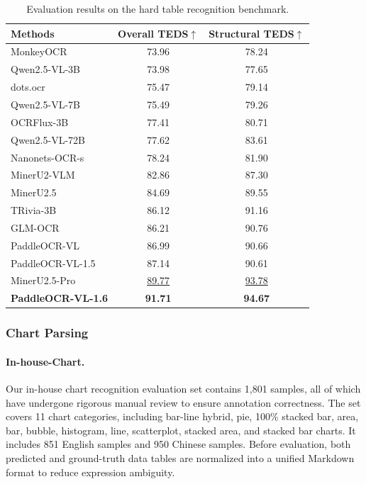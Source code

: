 \documentclass[11pt, a4paper,logo,  copyright, nonumbering]{paddleocr}
\begin{document}
\begin{table}[H]
    \centering
    \scriptsize
    \setlength{\tabcolsep}{4pt}
    \renewcommand{\arraystretch}{0.85}
    \begin{tabular}{l|c c}
        \toprule
        \textbf{Methods} & \textbf{Overall TEDS$\uparrow$} & \textbf{Structural TEDS$\uparrow$} \\
        \midrule
        MonkeyOCR~\cite{li2025monkeyocr} & 73.96 & 78.24 \\
        Qwen2.5-VL-3B~\cite{bai2025qwen2} & 73.98 & 77.65 \\
        dots.ocr~\cite{dotsocr} & 75.47 & 79.14 \\
        Qwen2.5-VL-7B~\cite{bai2025qwen2} & 75.49 & 79.26 \\
        OCRFlux-3B~\cite{OCRFlux} & 77.41 & 80.71 \\
        Qwen2.5-VL-72B~\cite{bai2025qwen2} & 77.62 & 83.61 \\
        Nanonets-OCR-s~\cite{Nanonets-OCR-S} & 78.24 & 81.90 \\
        MinerU2-VLM~\cite{MinerU2} & 82.86 & 87.30 \\
        MinerU2.5~\cite{niu2025mineru2} & 84.69 & 89.55 \\
        TRivia-3B~\cite{TRivia} & 86.12 & 91.16 \\
        GLM-OCR~\cite{duan2026glmocrtechnicalreport} & 86.21 & 90.76 \\
        PaddleOCR-VL~\cite{cui2025paddleocrvl} & 86.99 & 90.66 \\
        PaddleOCR-VL-1.5\cite{cui2026paddleocrvl15multitask09bvlm} & 87.14 & 90.61 \\
        MinerU2.5-Pro\cite{MinerU25Pro} & \cellcolor{cyan!15}\underline{89.77} & \cellcolor{cyan!15}\underline{93.78} \\
        \textbf{PaddleOCR-VL-1.6} & \cellcolor{red!15}\textbf{91.71} & \cellcolor{red!15}\textbf{94.67} \\
        \bottomrule
    \end{tabular}%
    \caption{Evaluation results on the hard table recognition benchmark.}
    \label{tab:hard_table_recognition}
\end{table}

\subsubsection{Chart Parsing}

\paragraph{In-house-Chart.}
Our in-house chart recognition evaluation set contains 1,801 samples, all of which have undergone rigorous manual review to ensure annotation correctness. The set covers 11 chart categories, including bar-line hybrid, pie, 100\% stacked bar, area, bar, bubble, histogram, line, scatterplot, stacked area, and stacked bar charts. It includes 851 English samples and 950 Chinese samples. Before evaluation, both predicted and ground-truth data tables are normalized into a unified Markdown format to reduce expression ambiguity.
\end{document}
